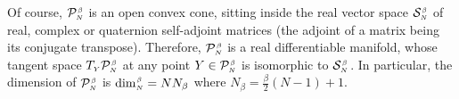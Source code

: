 \documentclass[draftclsnofoot]{IEEEtran}
\begin{document}
Of course, $\mathcal{P}^{\hspace{0.02cm}\scriptscriptstyle \beta}_{\scriptscriptstyle N}$ is an open convex cone, sitting inside the real vector space $\mathcal{S}^{\hspace{0.02cm}\scriptscriptstyle \beta}_{\scriptscriptstyle N}$ of real, complex or quaternion self-adjoint matrices (the adjoint of a matrix being its conjugate transpose). Therefore, $\mathcal{P}^{\hspace{0.02cm}\scriptscriptstyle \beta}_{\scriptscriptstyle N}$ is a real differentiable manifold, whose tangent space $T_{\scriptscriptstyle Y}\mathcal{P}^{\hspace{0.02cm}\scriptscriptstyle \beta}_{\scriptscriptstyle N}$ at any point $Y \in \mathcal{P}^{\hspace{0.02cm}\scriptscriptstyle \beta}_{\scriptscriptstyle N}$ is isomorphic to $\mathcal{S}^{\hspace{0.02cm}\scriptscriptstyle \beta}_{\scriptscriptstyle N}\hspace{0.03cm}$. In particular, the dimension of $\mathcal{P}^{\hspace{0.02cm}\scriptscriptstyle \beta}_{\scriptscriptstyle N}$ is $\dim^{\hspace{0.02cm}\scriptscriptstyle \beta}_{\scriptscriptstyle N} = NN_\beta$ where $N_\beta = \frac{\beta}{2}(N-1) + 1$.
\end{document}
